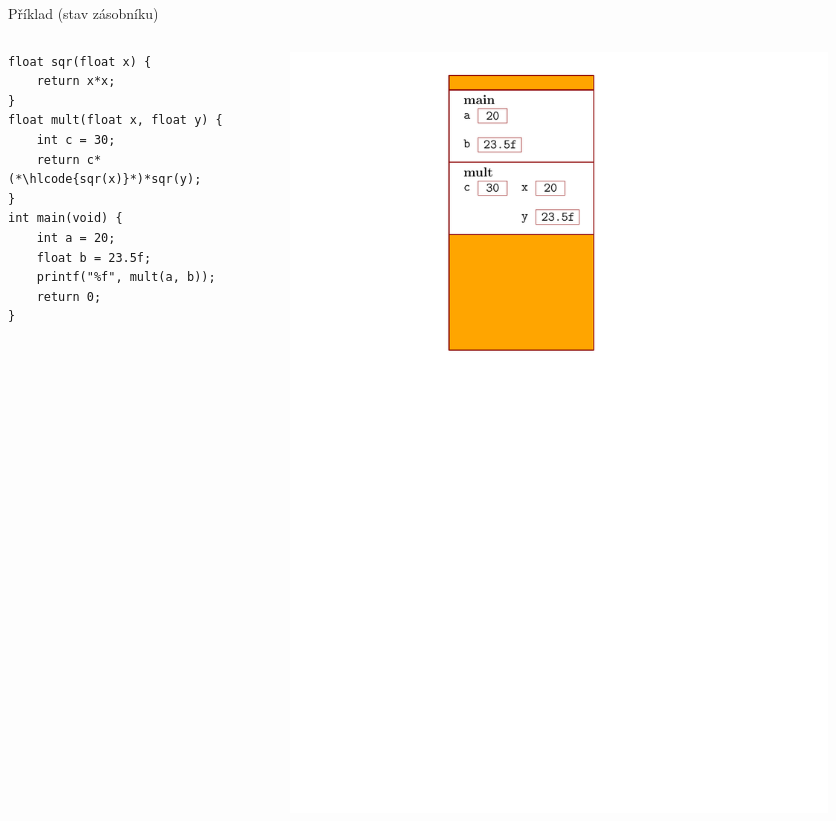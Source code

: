 \documentclass[14pt,aspectratio=169]{beamer}
\begin{document}
    \begin{frame}[t,fragile]{Příklad (stav zásobníku)}
        \begin{columns}[onlytextwidth]
            \begin{column}{0.55\textwidth}
                \begin{lstlisting}
float sqr(float x) {
    return x*x;
}
float mult(float x, float y) {
    int c = 30;
    return c*(*\hlcode{sqr(x)}*)*sqr(y);
}
int main(void) {
    int a = 20;
    float b = 23.5f;
    printf("%f", mult(a, b));
    return 0;
}
                \end{lstlisting}
            \end{column}
            \begin{column}{0.4\textwidth}
                \begin{figure}
                    \centering
                    \includegraphics[scale=.6]{images/zasobnik_stav_6.pdf}
                \end{figure}
            \end{column}
        \end{columns}
    \end{frame}
\end{document}
